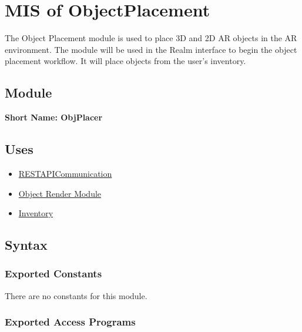\documentclass[12pt, titlepage]{article}
\begin{document}
\section{MIS of ObjectPlacement} \label{obj-place}

The Object Placement module is used to place 3D and 2D AR objects in the AR environment. The module will be used in the Realm interface to begin the object placement workflow. It will place objects from the user's inventory.

\subsection{Module}

\textbf{Short Name: ObjPlacer}

\subsection{Uses}
\begin{itemize}
  \item \hyperref[rest-api]{RESTAPICommunication}
  \item \hyperref[ObjectRenderModule]{Object Render Module}
  \item \hyperref[inventory]{Inventory}
\end{itemize}

\subsection{Syntax}

\subsubsection{Exported Constants}
There are no constants for this module.

\subsubsection{Exported Access Programs}
\end{document}
